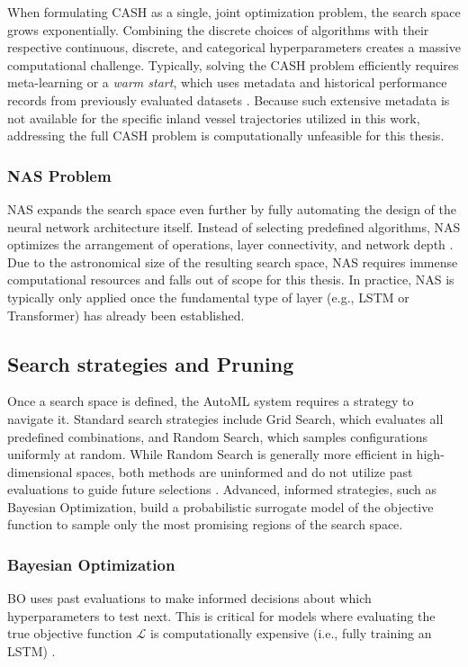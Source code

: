 When formulating \ac{CASH} as a single, joint optimization problem, the search space grows exponentially. Combining the discrete choices of algorithms with their respective continuous, discrete, and categorical hyperparameters creates a massive computational challenge. Typically, solving the \ac{CASH} problem efficiently requires meta-learning or a \emph{warm start}, which uses metadata and historical performance records from previously evaluated datasets \parencite{AutoMLHoos}. Because such extensive metadata is not available for the specific inland vessel trajectories utilized in this work, addressing the full \ac{CASH} problem is computationally unfeasible for this thesis. %


\subsubsection{NAS Problem}
\acf{NAS} expands the search space even further by fully automating the design of the neural network architecture itself. Instead of selecting predefined algorithms, \ac{NAS} optimizes the arrangement of operations, layer connectivity, and network depth \parencite{AutoMLHoos}. Due to the astronomical size of the resulting search space, \ac{NAS} requires immense computational resources and falls out of scope for this thesis. In practice, \ac{NAS} is typically only applied once the fundamental type of layer (e.g., \ac{LSTM} or Transformer) has already been established.

\subsection{Search strategies and Pruning}
Once a search space is defined, the \ac{AutoML} system requires a strategy to navigate it. Standard search strategies include Grid Search, which evaluates all predefined combinations, and Random Search, which samples configurations uniformly at random. While Random Search is generally more efficient in high-dimensional spaces,%
both methods are uninformed and do not utilize past evaluations to guide future selections \parencite{hutter2019automated}. Advanced, informed strategies, such as Bayesian Optimization, build a probabilistic surrogate model of the objective function to sample only the most promising regions of the search space. 


\subsubsection{Bayesian Optimization}
\acf{BO} uses past evaluations to make informed decisions about which hyperparameters to test next. This is critical for models where evaluating the true objective function $\mathcal{L}$ is computationally expensive (i.e., fully training an \ac{LSTM}) \parencite{hutter2019automated}.

